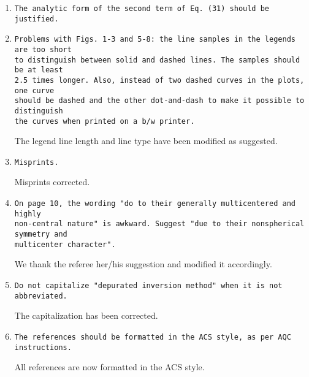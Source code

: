 \documentclass[10pt]{article}
\begin{document}
\begin{enumerate}
 \item {\tt The analytic form of the second term of Eq. (31) should 
 be justified.}
 
 \item {\tt Problems with Figs.~1-3 and 5-8: the line samples in the 
 legends are too short \\ to distinguish between solid and dashed lines.
 The samples should be at least \\ 2.5 times longer. Also, instead of 
 two dashed curves in the plots, one curve \\ should be dashed and the 
 other dot-and-dash to make it possible to distinguish \\ the curves 
 when printed on a b/w printer.}
 
 The legend line length and line type have been modified as suggested.
 
 \item {\tt Misprints.}
 
 Misprints corrected. 
 
 \item {\tt On page 10, the wording "do to their generally multicentered 
 and highly \\ non-central nature" is awkward. Suggest "due to their 
 nonspherical symmetry and \\ multicenter character".}
 
 We thank the referee her/his suggestion and modified it accordingly.
 
 \item {\tt Do not capitalize "depurated inversion method" when it is 
 not abbreviated.}
 
 The capitalization has been corrected.

 \item {\tt The references should be formatted in the ACS style, as 
 per AQC instructions.}
 
 All references are now formatted in the ACS style.
 
\end{enumerate}
\end{document}
